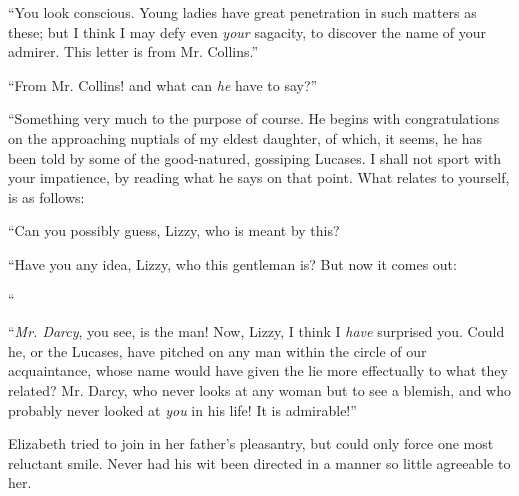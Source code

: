 “You look conscious. Young ladies have great penetration in such matters as these; but I think I may defy even {\em your} sagacity, to discover the name of your admirer. This letter is from Mr. Collins.”

“From Mr. Collins! and what can {\em he} have to say?”

“Something very much to the purpose of course. He begins with congratulations on the approaching nuptials of my eldest daughter, of which, it seems, he has been told by some of the good-natured, gossiping Lucases. I shall not sport with your impatience, by reading what he says on that point. What relates to yourself, is as follows: 

“Can you possibly guess, Lizzy, who is meant by this? 

“Have you any idea, Lizzy, who this gentleman is? But now it comes out:

“

“{\em Mr. Darcy}, you see, is the man! Now, Lizzy, I think I {\em have} surprised you. Could he, or the Lucases, have pitched on any man within the circle of our acquaintance, whose name would have given the lie more effectually to what they related? Mr. Darcy, who never looks at any woman but to see a blemish, and who probably never looked at {\em you} in his life! It is admirable!”

Elizabeth tried to join in her father's pleasantry, but could only force one most reluctant smile. Never had his wit been directed in a manner so little agreeable to her.

